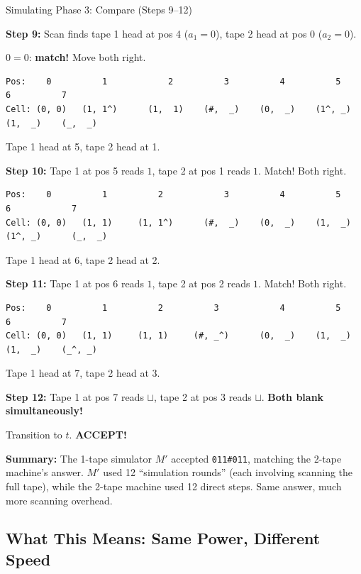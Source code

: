 \documentclass[11pt,a4paper]{article}
\begin{document}
\begin{examplebox}{{Simulating Phase 3: Compare (Steps 9--12)}}

\textbf{Step 9:} Scan finds tape 1 head at pos 4 ($a_1 = 0$), tape 2 head at pos 0 ($a_2 = 0$).

$0 = 0$: \textbf{match!} Move both right.
\begin{lstlisting}
Pos:    0          1            2          3          4          5            6          7
Cell: (0, 0)   (1, 1^)      (1,  1)    (#,  _)    (0,  _)    (1^, _)      (1,  _)    (_,  _)
\end{lstlisting}
Tape 1 head at 5, tape 2 head at 1.

\textbf{Step 10:} Tape 1 at pos 5 reads $1$, tape 2 at pos 1 reads $1$. Match! Both right.
\begin{lstlisting}
Pos:    0          1          2            3          4          5          6            7
Cell: (0, 0)   (1, 1)     (1, 1^)      (#,  _)    (0,  _)    (1,  _)    (1^, _)      (_,  _)
\end{lstlisting}
Tape 1 head at 6, tape 2 head at 2.

\textbf{Step 11:} Tape 1 at pos 6 reads $1$, tape 2 at pos 2 reads $1$. Match! Both right.
\begin{lstlisting}
Pos:    0          1          2          3            4          5          6          7
Cell: (0, 0)   (1, 1)     (1, 1)     (#, _^)      (0,  _)    (1,  _)    (1,  _)    (_^, _)
\end{lstlisting}
Tape 1 head at 7, tape 2 head at 3.

\textbf{Step 12:} Tape 1 at pos 7 reads $\sqcup$, tape 2 at pos 3 reads $\sqcup$. \textbf{Both blank simultaneously!}

Transition to $t$. \textbf{ACCEPT!}

\textbf{Summary:} The 1-tape simulator $M'$ accepted \texttt{011\#011}, matching the 2-tape machine's answer. $M'$ used 12 ``simulation rounds'' (each involving scanning the full tape), while the 2-tape machine used 12 direct steps. Same answer, much more scanning overhead.
\end{examplebox}

\subsection{What This Means: Same Power, Different Speed}
\end{document}
